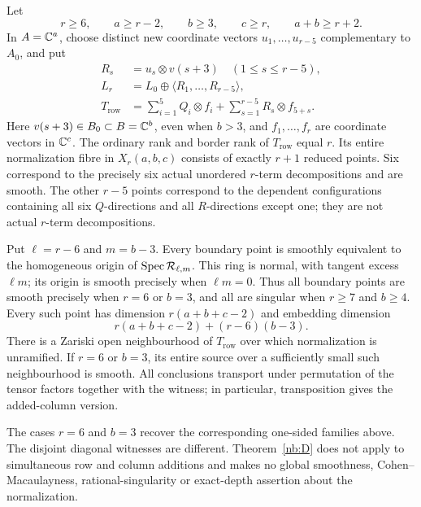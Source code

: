 \begin{theorem}\label{nb:D}
Let
\[
 r\geq6,\qquad a\geq r-2,\qquad b\geq3,\qquad c\geq r,
 \qquad a+b\geq r+2.
\]
In $A=\mathbb C^a$, choose distinct new coordinate vectors
$u_1,\ldots,u_{r-5}$ complementary to $A_0$, and put
\begin{equation}\label{nb:row-witness}
 \begin{split}
 R_s&=u_s\otimes v(s+3)\quad(1\leq s\leq r-5),\\
 L_r&=L_0\oplus\langle R_1,\ldots,R_{r-5}\rangle,\\
 T_{\mathrm{row}}
 &=\sum_{i=1}^5Q_i\otimes f_i+
              \sum_{s=1}^{r-5}R_s\otimes f_{5+s}.
 \end{split}
\end{equation}
Here $v(s+3)\in B_0\subset B=\mathbb C^b$, even when $b>3$, and
$f_1,\ldots,f_r$ are coordinate vectors in $\mathbb C^c$.
The ordinary rank and border rank of $T_{\mathrm{row}}$ equal $r$.
Its entire normalization fibre in $X_r(a,b,c)$ consists of exactly
$r+1$ reduced points. Six correspond to the precisely six actual
unordered $r$-term decompositions and are smooth. The other $r-5$
points correspond to the dependent configurations containing all six
$Q$-directions and all $R$-directions except one; they are not actual
$r$-term decompositions.

Put $\ell=r-6$ and $m=b-3$. Every boundary point is smoothly equivalent
to the homogeneous origin of $\operatorname{Spec}\mathcal R_{\ell,m}$. This ring is
normal, with tangent excess $\ell m$; its origin is smooth precisely
when $\ell m=0$. Thus all boundary points are smooth precisely when
$r=6$ or $b=3$, and all are singular when $r\geq7$ and $b\geq4$.
Every such point has dimension $r(a+b+c-2)$ and embedding dimension
\[
 r(a+b+c-2)+(r-6)(b-3).
\]
There is a Zariski open neighbourhood of $T_{\mathrm{row}}$ over which
normalization is unramified. If $r=6$ or $b=3$, its entire source over
a sufficiently small such neighbourhood is smooth. All conclusions
transport under permutation of the tensor factors together with the
witness; in particular, transposition gives the added-column version.
\end{theorem}

The cases $r=6$ and $b=3$ recover the corresponding one-sided families
above. The disjoint diagonal witnesses are different. Theorem~\ref{nb:D}
does not apply to simultaneous row and column additions and makes no
global smoothness, Cohen--Macaulayness, rational-singularity or
exact-depth assertion about the normalization.

